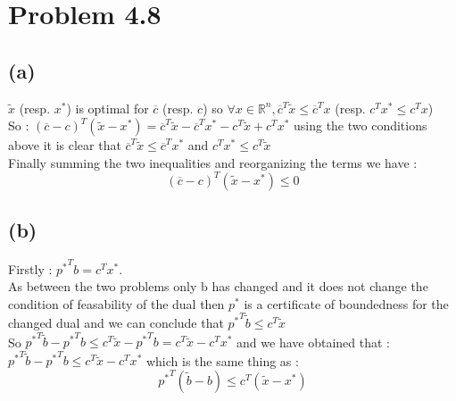 \documentclass{article}
\begin{document}
\section*{Problem 4.8}
\subsection*{(a)}
$\tilde{x}$ (resp. $ x^*$) is optimal for $\overline{c}$ (resp. $c$) so $\forall x\in\mathbb{R}^n, \overline{c}^T\tilde{x}\leq \overline{c}^Tx$ (resp. $c^Tx^*\leq c^Tx$)
\\
So : $(\overline{c}-c)^T(\tilde{x}-x^*) = \overline{c}^T\tilde{x}-\overline{c}^Tx^*-c^T\tilde{x}+c^Tx^*$ using the two conditions above it is clear that $\overline{c}^T\tilde{x}\leq \overline{c}^Tx^*$ and $c^Tx^*\leq c^T\tilde{x}$
\\
Finally summing the two inequalities and reorganizing the terms we have :$$\boxed{(\overline{c}-c)^T(\tilde{x}-x^*)\leq 0}$$
\subsection*{(b)}
Firstly : ${p^*}^Tb = c^Tx^*$.
\\
As between the two problems only b has changed and it does not change the condition of feasability of the dual then $p^*$ is a certificate of boundedness for the changed dual and we can conclude that ${p^*}^T\tilde{b}\leq c^T \tilde{x}$
\\
So ${p^*}^T\tilde{b}-{p^*}^Tb\leq c^T \tilde{x}-{p^*}^Tb =c^T \tilde{x}-c^Tx^* $ and we have obtained that : ${p^*}^T\tilde{b}-{p^*}^Tb\leq c^T \tilde{x}-c^Tx^*$
which is the same thing as : $$\boxed{{p^*}^T(\tilde{b}-b)\leq c^T( \tilde{x}-x^*)}$$
\end{document}
